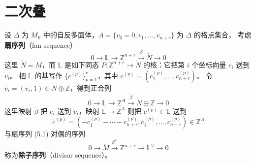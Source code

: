 

\section{二次叠}

设 $\Delta$ 为 $M_{\mathbb{R}}$ 中的自反多面体，$A=\{v_{0}=0,v_{1},\dots,v_{n+r}\}$ 为 $\Delta$ 的格点集合，
考虑\textbf{扇序列}（fan sequence）
\begin{equation}
  0\to\mathbb{L}\to\mathbb{Z}^{n+r}\xrightarrow{\beta}\check{N}\to 0 \tag{5.1}
\end{equation}
这里 $\check{N}=M$，而 $\mathbb{L}$ 是如下同态 $P\colon\mathbb{Z}^{n+r}\to\check{N}$ 的核：它把第 $i$ 个坐标向量
$e_{i}$ 送到 $v_{i}$。
把 $\mathbb{L}$ 的基写作 $\{c^{(p)}\}_{p=1}^{r}$，其中 $c^{(p)}=(c_{1}^{(p)},\dots,c_{n+r}^{(p)})$。
令 $\tilde{v}_{i}=(v_{i},1)\in\check{N}\oplus\mathbb{Z}$，得到正合列
\begin{equation}
  0\to\mathbb{L}\to\mathbb{Z}^{A}\xrightarrow{\tilde{\beta}}\check{N}\oplus\mathbb{Z}\to 0 \tag{5.2}
\end{equation}
这里映射 $\tilde{\beta}$ 把 $e_{i}$ 送到 $\tilde{v}_{i}$，映射 $\mathbb{L}\to\mathbb{Z}^{A}$ 则把 $c^{(p)}\in\mathbb{L}$ 送到
\begin{equation}
  \tilde{c}^{(p)}=(-c_{1}^{(p)}-\cdots-c_{n+r}^{(p)},c_{1}^{(p)},\dots,c_{n+r}^{(p)})\in\mathbb{Z}^{A} \tag{5.3}
\end{equation}
与扇序列 (5.1) 对偶的序列
\begin{equation}
  0\to\check{M}\xrightarrow{\beta^{\vee}}\mathbb{Z}^{n+r}\to\mathbb{L}^{\vee}\to 0 \tag{5.4}
\end{equation}
称为\textbf{除子序列}（divisor sequence）。

